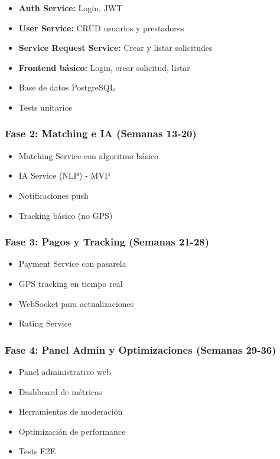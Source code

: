 \documentclass[12pt,a4paper,spanish]{article}
\begin{document}
\begin{itemize}
    \item \textbf{Auth Service:} Login, JWT
    \item \textbf{User Service:} CRUD usuarios y prestadores
    \item \textbf{Service Request Service:} Crear y listar solicitudes
    \item \textbf{Frontend básico:} Login, crear solicitud, listar
    \item Base de datos PostgreSQL
    \item Tests unitarios
\end{itemize}

\subsubsection{Fase 2: Matching e IA (Semanas 13-20)}

\begin{itemize}
    \item Matching Service con algoritmo básico
    \item IA Service (NLP) - MVP
    \item Notificaciones push
    \item Tracking básico (no GPS)
\end{itemize}

\subsubsection{Fase 3: Pagos y Tracking (Semanas 21-28)}

\begin{itemize}
    \item Payment Service con pasarela
    \item GPS tracking en tiempo real
    \item WebSocket para actualizaciones
    \item Rating Service
\end{itemize}

\subsubsection{Fase 4: Panel Admin y Optimizaciones (Semanas 29-36)}

\begin{itemize}
    \item Panel administrativo web
    \item Dashboard de métricas
    \item Herramientas de moderación
    \item Optimización de performance
    \item Tests E2E
\end{itemize}
\end{document}
